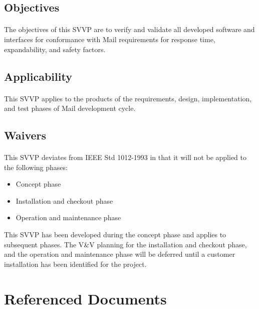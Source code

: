 \documentclass[11pt,a4paper]{article}
\begin{document}
        \subsection{Objectives}
            \paragraph{} The objectives of this SVVP are to verify and validate all developed software and interfaces for conformance with Mail requirements for response time, expandability, and safety factors.
        \subsection{Applicability}
            \paragraph{} This SVVP applies to the products of the requirements, design, implementation, and test phases of Mail development cycle.
        \subsection{Waivers}
            \paragraph{} This SVVP deviates from IEEE Std 1012-1993 in that it will not be applied to the following phases:
            \begin{itemize}
                \item Concept phase
                \item Installation and checkout phase
                \item Operation and maintenance phase
            \end{itemize}
            This SVVP has been developed during the concept phase and applies to subsequent phases. The V\&V planning for the installation and checkout phase, and the operation and maintenance phase will be deferred until a customer installation has been identified for the project.
    \clearpage
    \section{Referenced Documents}\label{section:reference}
\end{document}
